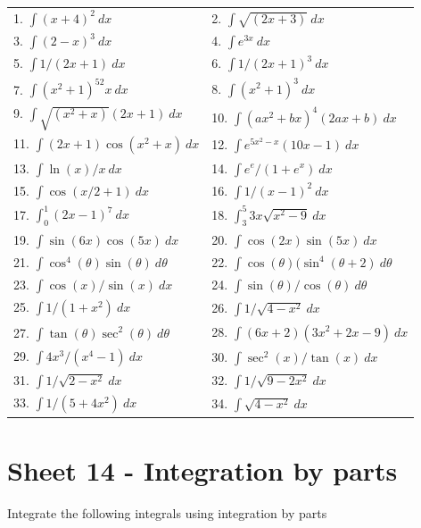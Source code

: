 \documentclass[
  11pt,
  oneside]{book}
\newcommand{\slide}{}
\theoremstyle{definition}
\theoremstyle{definition}
\theoremstyle{definition}
\theoremstyle{definition}
\theoremstyle{remark}
\begin{document}
\begin{tabular}{l|l}
\hline
 & \\
\hline
1. $\int (x+4)^2\ dx$ & 2. $\int \sqrt{(2x+3)}\ dx$\\
\hline
3. $\int (2-x)^3\ dx$ & 4. $\int e^{3x}\ dx$\\
\hline
5. $\int 1/(2x+1)\ dx$ & 6. $\int 1/(2x+1)^3\ dx$\\
\hline
7. $\int (x^2+1)^52x \ dx$ & 8. $\int (x^2+1)^3\ dx$\\
\hline
9. $\int \sqrt{(x^2+x)}(2x+1) \ dx$ & 10. $\int (ax^2+bx)^4(2ax+b)\ dx$\\
\hline
11. $\int (2x+1)\cos(x^2+x) \ dx$ & 12. $\int e^{5x^2-x}(10x-1)\ dx$\\
\hline
13. $\int \ln(x)/x \ dx$ & 14. $\int e^e/(1+e^x)\ dx$\\
\hline
15. $\int \cos(x/2+1)\ dx$ & 16. $\int 1/(x-1)^2\ dx$\\
\hline
17. $\int_0^1 (2x-1)^7\ dx$ & 18. $\int_3^5 3x\sqrt{x^2-9}\ dx$\\
\hline
19. $\int\sin(6x)\cos(5x) \ dx$ & 20. $\int \cos(2x)\sin(5x)\ dx$\\
\hline
21. $\int \cos^4(\theta)\sin(\theta)\ d\theta$ & 22. $\int \cos(\theta)(\sin^4(\theta+2)\ d\theta$\\
\hline
23. $\int \cos(x)/\sin(x)\ dx$ & 24. $\int \sin(\theta)/\cos(\theta)\ d\theta$\\
\hline
25. $\int 1/(1+x^2)\ dx$ & 26. $\int 1/\sqrt{4-x^2}\ dx$\\
\hline
27. $\int \tan(\theta)\sec^2(\theta)\ d\theta$ & 28. $\int (6x+2)(3x^2+2x-9)\ dx$\\
\hline
29. $\int 4x^3/(x^4-1)\ dx$ & 30. $\int \sec^2(x)/\tan(x)\ dx$\\
\hline
31. $\int 1/\sqrt{2-x^2}\ dx$ & 32. $\int 1/\sqrt{9-2x^2}\ dx$\\
\hline
33. $\int 1/(5+4x^2)\ dx$ & 34. $\int \sqrt{4-x^2}\ dx$\\
\hline
\end{tabular}
\slide

\section{Sheet 14 - Integration by parts}\label{sheet-14---integration-by-parts}

Integrate the following integrals using integration by parts
\end{document}
